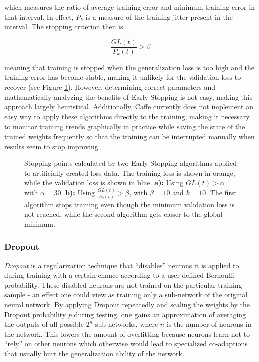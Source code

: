 \noindent which measures the ratio of average training error and minimum training error in that interval. In effect, $P_k$ is a measure of the training jitter present in the interval. The stopping criterion then is 

\[ \frac{GL(t)}{P_k(t)} > \beta \]

\noindent meaning that training is stopped when the generalization loss is too high and the training error has become stable, making it unlikely for the validation loss to recover (see Figure \ref{fig:early_stopping}). However, determining correct parameters and mathematically analyzing the benefits of Early Stopping is not easy, making this approach largely heuristical. Additionally, Caffe currently does not implement an easy way to apply these algorithms directly to the training, making it necessary to monitor training trends graphically in practice while saving the state of the trained weights frequently so that the training can be interrupted manually when results seem to stop improving.


\begin {figure}[!ht]
	\begin{center}
		\scalebox{0.7}{}
	\end{center}
	\caption[]{Stopping points calculated by two Early Stopping algorithms applied to artificially created loss data. The training loss is shown in orange, while the validation loss is shown in blue. \textbf{a):} Using $GL(t) > \alpha$ with $\alpha = 30$. \textbf{b):} Using $\frac{GL(t)}{P_k(t)} > \beta$, with $\beta = 10$ and $k = 10$. The first algorithm stops training even though the minimum validation loss is not reached, while the second algorithm gets closer to the global minimum. }
	\label{fig:early_stopping}
\end {figure}


	\subsubsection {Dropout}
\label{subsec:dropout}
\textit{Dropout} is a regularization technique \cite{dropout} that ``disables'' neurons it is applied to during training with a certain chance according to a user-defined Bernoulli probability. These disabled neurons are not trained on the particular training sample - an effect one could view as training only a sub-network of the original neural network. By applying Dropout repeatedly and scaling the weights by the Dropout probability $p$ during testing, one gains an approximation of averaging the outputs of all possible $2^n$ sub-networks, where $n$ is the number of neurons in the network. This lowers the amount of overfitting because neurons learn not to ``rely'' on other neurons which otherwise would lead to specialized co-adaptions that usually hurt the generalization ability of the network.



